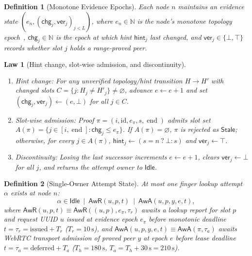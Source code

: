 \documentclass[journal]{IEEEtran}
\newtheorem{definition}{Definition}
\newtheorem{law}{Law}
\begin{document}
\begin{definition}[Monotone Evidence Epochs]\label{def:evidence-epochs}
Each node $n$ maintains an evidence state $(e_n,(\mathsf{chg}_j,\mathsf{ver}_j)_{j<L})$,
where $e_n\in\mathbb{N}$ is the node's monotone topology epoch~\cite{Fidge1988},
$\mathsf{chg}_j\in\mathbb{N}$ is the epoch at which hint $\mathsf{hint}_j$ last
changed, and $\mathsf{ver}_j\in\{\bot,\top\}$ records whether slot $j$ holds a
range-proved peer.
\end{definition}

\begin{law}[Hint change, slot-wise admission, and discontinuity]\label{law:evidence-epochs}
\leavevmode
\begin{enumerate}[leftmargin=1.5em]
\item \emph{Hint change:} For any unverified topology/hint transition $H\to H'$ with changed
slots $C=\{j:H_j\neq H'_j\}\neq\varnothing$, advance $e\gets e+1$ and set
$(\mathsf{chg}_j,\mathsf{ver}_j)\gets(e,\bot)$ for all $j\in C$.
\item \emph{Slot-wise admission:} Proof $\pi=(i,\mathrm{id},e_\pi,s,\operatorname{end})$
admits slot set $A(\pi)=\{j\in[i,\operatorname{end}]:\mathsf{chg}_j\le e_\pi\}$.
If $A(\pi)=\varnothing$, $\pi$ is rejected as $\mathsf{Stale}$; otherwise, for
every $j\in A(\pi)$, $\mathsf{hint}_j\gets(s=n\ ?\ \bot : s)$ and
$\mathsf{ver}_j\gets\top$.
\item \emph{Discontinuity:} Losing the last successor increments $e\gets e+1$,
clears $\mathsf{ver}_j\gets\bot$ for all $j$, and returns the attempt owner to
$\mathsf{Idle}$.
\end{enumerate}
\end{law}

\begin{definition}[Single-Owner Attempt State]\label{def:attempt-owner}
At most one finger lookup attempt $\alpha$ exists at node $n$:
\[
  \alpha \in \mathsf{Idle}
  \ \mid\ \mathsf{AwR}(u,p,t)
  \ \mid\ \mathsf{AwA}(u,p,y,e,t),
\]
where $\mathsf{AwR}(u,p,t)\equiv\mathsf{AwR}((u,p),e_\pi,\tau_r)$ awaits a
lookup report for slot $p$ and request UUID $u$ issued at evidence epoch $e_\pi$ before monotonic deadline
$t=\tau_r=\mathrm{issued}+T_r$ ($T_r=10\,\mathrm{s}$), and
$\mathsf{AwA}(u,p,y,e,t)\equiv\mathsf{AwA}(\pi,\tau_a)$ awaits WebRTC transport
admission of proved peer $y$ at epoch $e$ before lease deadline
$t=\tau_a=\mathrm{deferred}+T_a$ ($T_h=180\,\mathrm{s}$, $T_a=T_h+30\,\mathrm{s}=210\,\mathrm{s}$).
\end{definition}
\end{document}
